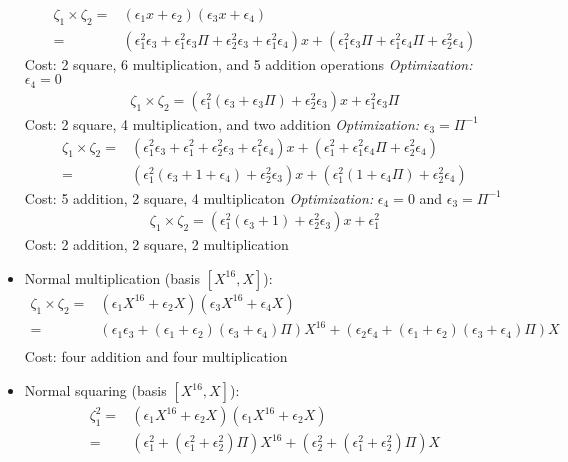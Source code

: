 \begin{itemize}
	\begin{align*}
	\zeta_1 \times \zeta_2 = & (\epsilon_1 x + \epsilon_2)(\epsilon_3 x + \epsilon_4)\\
	= & (\epsilon_1^2\epsilon_3 +\epsilon_1^2\epsilon_3\Pi + \epsilon_2^2\epsilon_3 + \epsilon_1^2\epsilon_4) x + (\epsilon_1^2\epsilon_3\Pi + \epsilon_1^2\epsilon_4\Pi + \epsilon_2^2\epsilon_4) 
	\end{align*}
	Cost: 2 square, 6 multiplication, and 5 addition operations
	\emph{Optimization:} $\epsilon_4 = 0$
	\begin{align*}
	\zeta_1 \times \zeta_2 = (\epsilon_1^2(\epsilon_3 + \epsilon_3\Pi) + \epsilon_2^2\epsilon_3)x + \epsilon_1^2\epsilon_3\Pi
	\end{align*}
	Cost: 2 square, 4 multiplication, and two addition
	\emph{Optimization:} $\epsilon_3 = \Pi^{-1}$
	\begin{align*}
	\zeta_1 \times \zeta_2 = & (\epsilon_1^2\epsilon_3 +\epsilon_1^2 + \epsilon_2^2\epsilon_3 + \epsilon_1^2\epsilon_4) x + (\epsilon_1^2 + \epsilon_1^2\epsilon_4\Pi + \epsilon_2^2\epsilon_4) \\
	= & (\epsilon_1^2(\epsilon_3 + 1 + \epsilon_4) + \epsilon_2^2\epsilon_3) x + (\epsilon_1^2(1 + \epsilon_4\Pi) + \epsilon_2^2\epsilon_4)
	\end{align*}
	Cost: 5 addition, 2 square, 4 multiplicaton
	\emph{Optimization:} $\epsilon_4 = 0$ and $\epsilon_3 = \Pi^{-1}$
	\begin{align*}
	\zeta_1 \times \zeta_2 = (\epsilon_1^2(\epsilon_3 + 1) + \epsilon_2^2\epsilon_3)x + \epsilon_1^2
	\end{align*}
	Cost: 2 addition, 2 square, 2 multiplication
	\item Normal multiplication (basis $[X^{16}, X]$):
	\begin{align*}
	\zeta_1 \times \zeta_2 = & (\epsilon_1 X^{16} + \epsilon_2 X)(\epsilon_3 X^{16} + \epsilon_4 X) \\
	= & (\epsilon_1\epsilon_3 + (\epsilon_1 + \epsilon_2)(\epsilon_3 + \epsilon_4)\Pi) X^{16} + (\epsilon_2\epsilon_4 + (\epsilon_1 + \epsilon_2)(\epsilon_3 + \epsilon_4)\Pi) X \\
	\end{align*}
	Cost: four addition and four multiplication
	\item Normal squaring (basis $[X^{16}, X]$):
	\begin{align*}
	\zeta_1^2 = & (\epsilon_1 X^{16} + \epsilon_2 X)(\epsilon_1 X^{16} + \epsilon_2 X) \\
	= & (\epsilon_1^2 + (\epsilon_1^2 + \epsilon_2^2)\Pi) X^{16} + (\epsilon_2^2 + (\epsilon_1^2 + \epsilon_2^2)\Pi) X

\end{align*}
\end{itemize}
